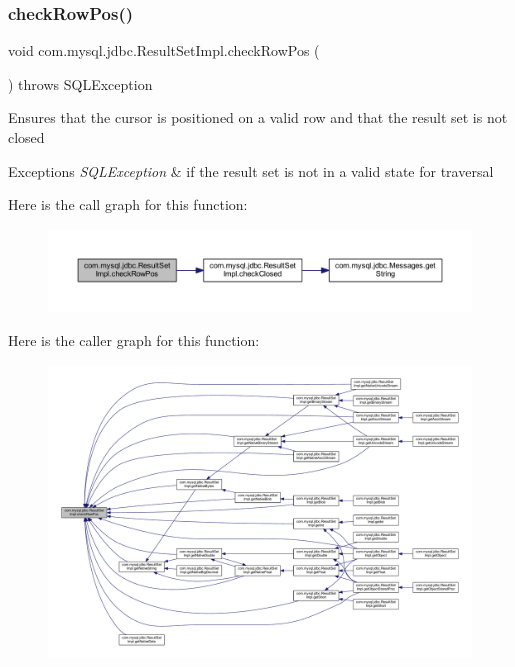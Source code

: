 \subsubsection{\texorpdfstring{check\+Row\+Pos()}{checkRowPos()}}
{\footnotesize\ttfamily void com.\+mysql.\+jdbc.\+Result\+Set\+Impl.\+check\+Row\+Pos (\begin{DoxyParamCaption}{ }\end{DoxyParamCaption}) throws S\+Q\+L\+Exception\hspace{0.3cm}{\ttfamily [protected]}}

Ensures that the cursor is positioned on a valid row and that the result set is not closed


\begin{DoxyExceptions}{Exceptions}
{\em S\+Q\+L\+Exception} & if the result set is not in a valid state for traversal \\
\hline
\end{DoxyExceptions}
Here is the call graph for this function\+:
\nopagebreak
\begin{figure}[H]
\begin{center}
\leavevmode
\includegraphics[width=350pt]{classcom_1_1mysql_1_1jdbc_1_1_result_set_impl_a317dc47f2dc4149cd98ae2f1c5201821_cgraph}
\end{center}
\end{figure}
Here is the caller graph for this function\+:
\nopagebreak
\begin{figure}[H]
\begin{center}
\leavevmode
\includegraphics[width=350pt]{classcom_1_1mysql_1_1jdbc_1_1_result_set_impl_a317dc47f2dc4149cd98ae2f1c5201821_icgraph}
\end{center}
\end{figure}
\mbox{\label{classcom_1_1mysql_1_1jdbc_1_1_result_set_impl_a1e36a4b0bf39b90b06dea75eb4d8c66e}} 
